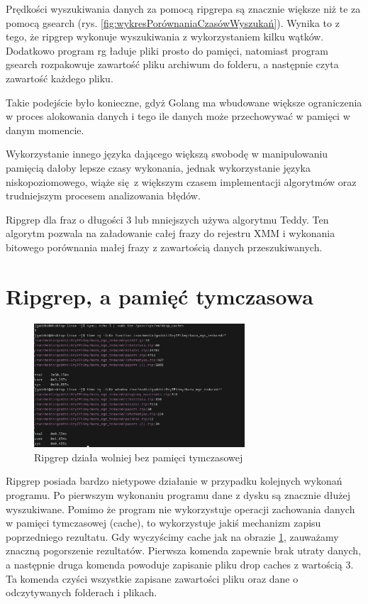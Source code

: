 Prędkości wyszukiwania danych za pomocą ripgrepa są znacznie większe niż te
za pomocą gsearch (rys. \ref{fig:wykresPorównaniaCzasówWyszukań}). Wynika to z
tego, że ripgrep wykonuje wyszukiwania z wykorzystaniem kilku wątków. Dodatkowo 
program rg ładuje pliki prosto do pamięci, natomiast program gsearch rozpakowuje
zawartość pliku archiwum do folderu, a następnie czyta zawartość każdego pliku.

Takie podejście było konieczne, gdyż Golang ma wbudowane większe ograniczenia w 
proces alokowania danych i tego ile danych może przechowywać w pamięci w danym momencie.

Wykorzystanie innego języka dającego większą swobodę w manipulowaniu pamięcią 
dałoby lepsze czasy wykonania, jednak wykorzystanie języka niskopoziomowego,
wiąże się z większym czasem implementacji algorytmów oraz trudniejszym procesem
analizowania błędów.

Ripgrep dla fraz o długości 3 lub mniejszych używa algorytmu Teddy. Ten algorytm
pozwala na załadowanie całej frazy do rejestru XMM i wykonania bitowego 
porównania małej frazy z zawartością danych przeszukiwanych.

\section{Ripgrep, a pamięć tymczasowa}


\begin{figure}[h]
    \centering
    \includegraphics[width=0.7\textwidth]{./images/ripgrep-clear-cache-slow.png}
    \caption{Ripgrep działa wolniej bez pamięci tymczasowej}
    \label{fig:ClearCacheRipgrep}
\end{figure}

Ripgrep posiada bardzo nietypowe działanie w przypadku kolejnych wykonań 
programu. Po pierwszym wykonaniu programu dane z dysku są znacznie dłużej
wyszukiwane. Pomimo że program nie wykorzystuje operacji zachowania danych
w pamięci tymczasowej (cache), to wykorzystuje jakiś mechanizm zapisu 
poprzedniego rezultatu. Gdy wyczyścimy cache jak na obrazie \ref{fig:ClearCacheRipgrep},
zauważamy znaczną pogorszenie rezultatów. Pierwsza komenda zapewnie brak utraty
danych, a następnie druga komenda powoduje zapisanie pliku drop caches z wartością 3.
Ta komenda czyści wszystkie zapisane zawartości pliku oraz dane o odczytywanych
folderach i plikach.

